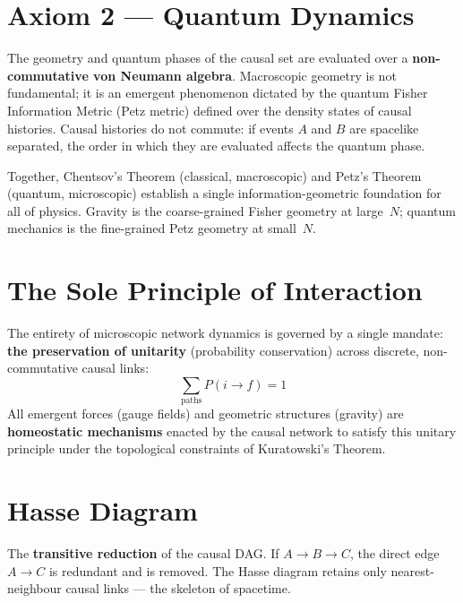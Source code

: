 \documentclass[11pt, a4paper, openany]{book}
\begin{document}
\section{Axiom 2 --- Quantum Dynamics}

\begin{axiom}
The geometry and quantum phases of the causal set are evaluated over a
\textbf{non-commutative von Neumann algebra}.  Macroscopic geometry is not
fundamental; it is an emergent phenomenon dictated by the quantum Fisher
Information Metric (Petz metric) defined over the density states of causal
histories.  Causal histories do not commute: if events $A$ and $B$ are
spacelike separated, the order in which they are evaluated affects the quantum
phase.
\end{axiom}

Together, Chentsov's Theorem (classical, macroscopic) and Petz's Theorem
(quantum, microscopic) establish a single information-geometric foundation for
all of physics.  Gravity is the coarse-grained Fisher geometry at large~$N$;
quantum mechanics is the fine-grained Petz geometry at small~$N$.

\section{The Sole Principle of Interaction}

\begin{axiom}
The entirety of microscopic network dynamics is governed by a single mandate:
\textbf{the preservation of unitarity} (probability conservation) across
discrete, non-commutative causal links:
\[
  \sum_{\text{paths}} P(i \to f) = 1
\]
All emergent forces (gauge fields) and geometric structures (gravity) are
\textbf{homeostatic mechanisms} enacted by the causal network to satisfy this
unitary principle under the topological constraints of Kuratowski's Theorem.
\end{axiom}

\section{Hasse Diagram}

The \textbf{transitive reduction} of the causal DAG.  If $A \to B \to C$, the
direct edge $A \to C$ is redundant and is removed.  The Hasse diagram retains
only nearest-neighbour causal links --- the skeleton of spacetime.
\end{document}

